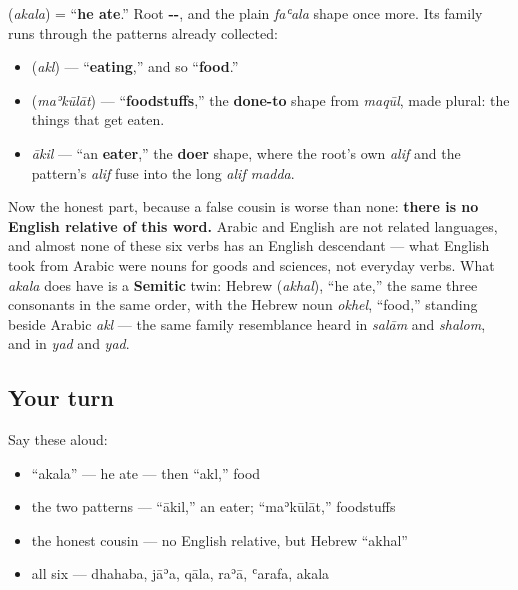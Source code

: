\begin{cousinweb}
\textbf{} (\emph{akala}) = \textquotedblleft{}\textbf{he ate}.\textquotedblright{} Root \textbf{--}, and the plain \emph{faʿala} shape once more. Its family runs through the patterns already collected:

\begin{itemize}
\raggedright
  \item \textbf{} (\emph{akl}) — \textquotedblleft{}\textbf{eating},\textquotedblright{} and so \textquotedblleft{}\textbf{food}.\textquotedblright{}
  \item \textbf{} (\emph{maʾkūlāt}) — \textquotedblleft{}\textbf{foodstuffs},\textquotedblright{} the \textbf{done-to} shape from \emph{maqūl}, made plural: the things that get eaten.
  \item \emph{ākil} — \textquotedblleft{}an \textbf{eater},\textquotedblright{} the \textbf{doer} shape, where the root's own \emph{alif} and the pattern's \emph{alif} fuse into the long \emph{alif madda}.
\end{itemize}

Now the honest part, because a false cousin is worse than none: \textbf{there is no English relative of this word.} Arabic and English are not related languages, and almost none of these six verbs has an English descendant — what English took from Arabic were nouns for goods and sciences, not everyday verbs. What \emph{akala} does have is a \textbf{Semitic} twin: Hebrew \textbf{} (\emph{akhal}), \textquotedblleft{}he ate,\textquotedblright{} the same three consonants in the same order, with the Hebrew noun \emph{okhel}, \textquotedblleft{}food,\textquotedblright{} standing beside Arabic \emph{akl} — the same family resemblance heard in \emph{salām} and \emph{shalom}, and in \emph{yad} and \emph{yad}.
\end{cousinweb}

\subsection*{Your turn}
Say these aloud:

\begin{itemize}
\raggedright
  \item \textquotedblleft{}akala\textquotedblright{} — he ate — then \textquotedblleft{}akl,\textquotedblright{} food
  \item the two patterns — \textquotedblleft{}ākil,\textquotedblright{} an eater; \textquotedblleft{}maʾkūlāt,\textquotedblright{} foodstuffs
  \item the honest cousin — no English relative, but Hebrew \textquotedblleft{}akhal\textquotedblright{}
  \item all six — dhahaba, jāʾa, qāla, raʾā, ʿarafa, akala
\end{itemize}


